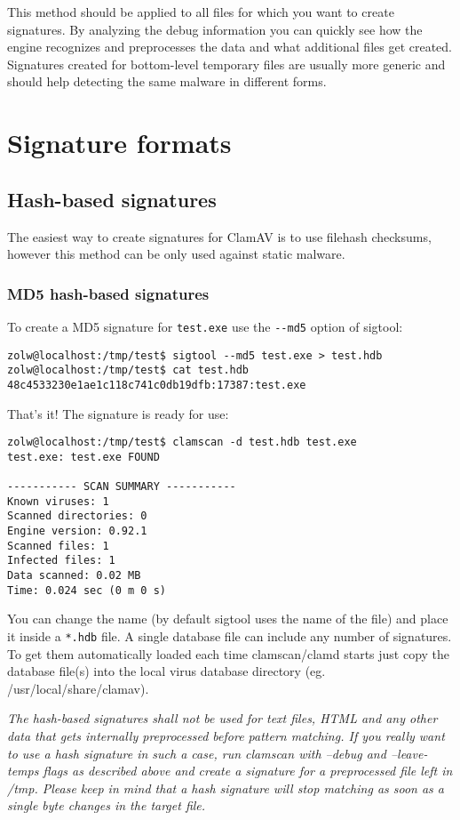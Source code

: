 \documentclass[a4paper,titlepage,12pt]{article}
\begin{document}
    This method should be applied to all files for which you want
    to create signatures. By analyzing the debug information you
    can quickly see how the engine recognizes and preprocesses
    the data and what additional files get created. Signatures
    created for bottom-level temporary files are usually more
    generic and should help detecting the same malware in
    different forms.

    \section{Signature formats}

    \subsection{Hash-based signatures}
    The easiest way to create signatures for ClamAV is to use filehash checksums,
    however this method can be only used against static malware.
    \subsubsection{MD5 hash-based signatures}
    To create a
    MD5 signature for \verb+test.exe+ use the \verb+--md5+ option of sigtool:
    \begin{verbatim}
zolw@localhost:/tmp/test$ sigtool --md5 test.exe > test.hdb
zolw@localhost:/tmp/test$ cat test.hdb
48c4533230e1ae1c118c741c0db19dfb:17387:test.exe
    \end{verbatim}
    That's it! The signature is ready for use:
    \begin{verbatim}
zolw@localhost:/tmp/test$ clamscan -d test.hdb test.exe
test.exe: test.exe FOUND

----------- SCAN SUMMARY -----------
Known viruses: 1
Scanned directories: 0
Engine version: 0.92.1
Scanned files: 1
Infected files: 1
Data scanned: 0.02 MB
Time: 0.024 sec (0 m 0 s)
    \end{verbatim}
    You can change the name (by default sigtool uses the name of the file)
    and place it inside a \verb+*.hdb+ file. A single database file can
    include any number of signatures. To get them automatically loaded
    each time clamscan/clamd starts just copy the database file(s) into
    the local virus database directory (eg. /usr/local/share/clamav).

    \emph{The hash-based signatures shall not be used for text files,
    HTML and any other data that gets internally preprocessed before
    pattern matching. If you really want to use a hash signature in
    such a case, run clamscan with --debug and --leave-temps flags
    as described above and create a signature for a preprocessed file
    left in /tmp. Please keep in mind that a hash signature will stop
    matching as soon as a single byte changes in the target file.}
\end{document}
